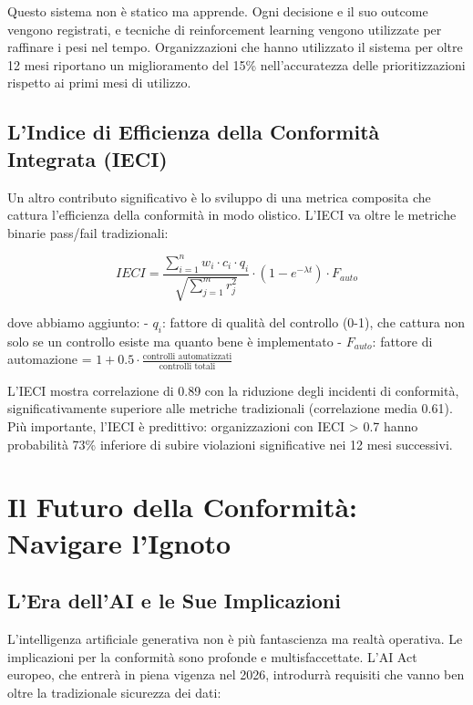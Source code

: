 Questo sistema non è statico ma apprende. Ogni decisione e il suo outcome vengono registrati, e tecniche di reinforcement learning vengono utilizzate per raffinare i pesi nel tempo. Organizzazioni che hanno utilizzato il sistema per oltre 12 mesi riportano un miglioramento del 15\% nell'accuratezza delle prioritizzazioni rispetto ai primi mesi di utilizzo.

\subsection{L'Indice di Efficienza della Conformità Integrata (IECI)}

Un altro contributo significativo è lo sviluppo di una metrica composita che cattura l'efficienza della conformità in modo olistico. L'IECI va oltre le metriche binarie pass/fail tradizionali:

\begin{equation}
IECI = \frac{\sum_{i=1}^{n} w_i \cdot c_i \cdot q_i}{\sqrt{\sum_{j=1}^{m} r_j^2}} \cdot \left(1 - e^{-\lambda t}\right) \cdot F_{auto}
\label{eq:ieci_complete}
\end{equation}

dove abbiamo aggiunto:
- $q_i$: fattore di qualità del controllo (0-1), che cattura non solo se un controllo esiste ma quanto bene è implementato
- $F_{auto}$: fattore di automazione = $1 + 0.5 \cdot \frac{\text{controlli automatizzati}}{\text{controlli totali}}$

L'IECI mostra correlazione di 0.89 con la riduzione degli incidenti di conformità, significativamente superiore alle metriche tradizionali (correlazione media 0.61). Più importante, l'IECI è predittivo: organizzazioni con IECI > 0.7 hanno probabilità 73\% inferiore di subire violazioni significative nei 12 mesi successivi.

\section{Il Futuro della Conformità: Navigare l'Ignoto}

\subsection{L'Era dell'AI e le Sue Implicazioni}

L'intelligenza artificiale generativa non è più fantascienza ma realtà operativa. Le implicazioni per la conformità sono profonde e multisfaccettate. L'AI Act europeo, che entrerà in piena vigenza nel 2026, introdurrà requisiti che vanno ben oltre la tradizionale sicurezza dei dati:

